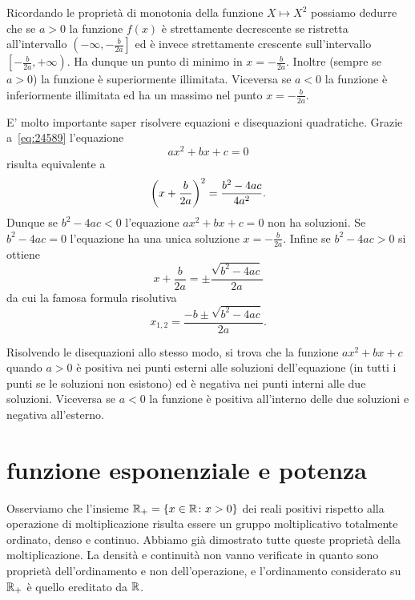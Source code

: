 Ricordando le proprietà di monotonia della funzione $X\mapsto X^2$
possiamo dedurre che se $a>0$ la funzione $f(x)$ è strettamente
decrescente se ristretta all'intervallo 
$\left(-\infty,-\frac b {2a}\right]$ ed è invece strettamente crescente 
sull'intervallo $\left[-\frac b{2a},+\infty\right)$. 
Ha dunque un punto di minimo in $x=-\frac{b}{2a}$.
Inoltre (sempre se $a>0$) la funzione è superiormente illimitata.
Viceversa se $a<0$ la funzione è inferiormente illimitata ed ha 
un massimo nel punto $x=-\frac{b}{2a}$.

E' molto importante saper risolvere equazioni e disequazioni
quadratiche. Grazie a~\eqref{eq:24589} l'equazione
\[
 a x^2 + bx + c = 0
\]
risulta equivalente a
\[
  {\left( x+\frac{b}{2a} \right)}^2 = \frac{b^2-4ac}{4a^2}.
\]
Dunque se $b^2-4ac<0$ l'equazione $ax^2+bx+c=0$ non ha soluzioni.
Se $b^2-4ac=0$ l'equazione ha una unica soluzione $x=-\frac{b}{2a}$.
Infine se $b^2-4ac>0$ si ottiene
\[
  x+\frac b{2a} = \pm \frac{\sqrt{b^2-4ac}}{2a}
\]
da cui la famosa formula risolutiva
\mymark{***}
\begin{equation}\label{eq:secondo_grado}
  x_{1,2} = \frac{-b \pm \sqrt{b^2-4ac}}{2a}.
\end{equation}

Risolvendo le disequazioni allo stesso modo, si trova
che la funzione $ax^2+bx+c$ quando $a>0$ è positiva
nei punti esterni alle soluzioni dell'equazione
(in tutti i punti se le soluzioni non esistono) ed
è negativa nei punti interni alle due soluzioni.
Viceversa se $a<0$ la funzione è positiva all'interno
delle due soluzioni e negativa all'esterno.

\section{funzione esponenziale e potenza}
\label{sec:esponenziale}

Osserviamo che l'insieme ${\mathbb R}_+ = {\left\{ x\in {\mathbb R}\colon x>0 \right\}}$ 
dei reali positivi rispetto alla operazione di moltiplicazione 
risulta essere un gruppo moltiplicativo totalmente ordinato, 
denso e continuo. 
Abbiamo già dimostrato tutte queste proprietà della moltiplicazione.
La densità e continuità non vanno verificate in quanto sono proprietà 
dell'ordinamento e non dell'operazione, e l'ordinamento considerato 
su ${\mathbb R}_+$ è quello ereditato da ${\mathbb R}$.

